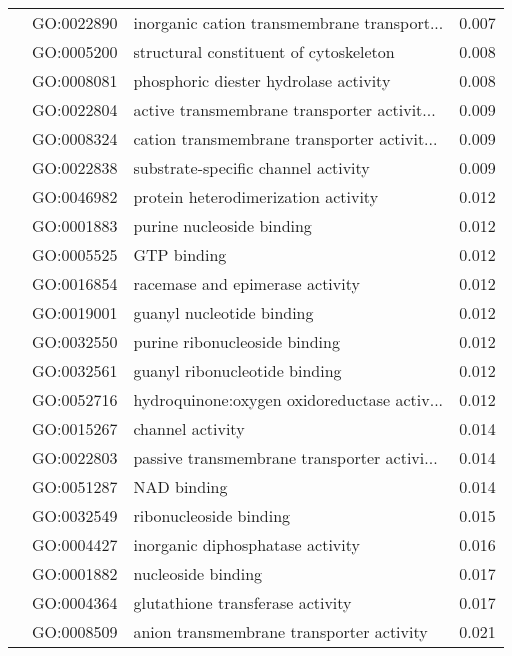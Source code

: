 \begin{longtable}{lllr}
   & GO:0022890 &  inorganic cation transmembrane transport... &         0.007 \\
   & GO:0005200 &       structural constituent of cytoskeleton &         0.008 \\
   & GO:0008081 &        phosphoric diester hydrolase activity &         0.008 \\
   & GO:0022804 &  active transmembrane transporter activit... &         0.009 \\
   & GO:0008324 &  cation transmembrane transporter activit... &         0.009 \\
   & GO:0022838 &          substrate-specific channel activity &         0.009 \\
   & GO:0046982 &          protein heterodimerization activity &         0.012 \\
   & GO:0001883 &                    purine nucleoside binding &         0.012 \\
   & GO:0005525 &                                  GTP binding &         0.012 \\
   & GO:0016854 &              racemase and epimerase activity &         0.012 \\
   & GO:0019001 &                    guanyl nucleotide binding &         0.012 \\
   & GO:0032550 &                purine ribonucleoside binding &         0.012 \\
   & GO:0032561 &                guanyl ribonucleotide binding &         0.012 \\
   & GO:0052716 &  hydroquinone:oxygen oxidoreductase activ... &         0.012 \\
   & GO:0015267 &                             channel activity &         0.014 \\
   & GO:0022803 &  passive transmembrane transporter activi... &         0.014 \\
   & GO:0051287 &                                  NAD binding &         0.014 \\
   & GO:0032549 &                       ribonucleoside binding &         0.015 \\
   & GO:0004427 &             inorganic diphosphatase activity &         0.016 \\
   & GO:0001882 &                           nucleoside binding &         0.017 \\
   & GO:0004364 &             glutathione transferase activity &         0.017 \\
   & GO:0008509 &     anion transmembrane transporter activity &         0.021 \\

\end{longtable}
